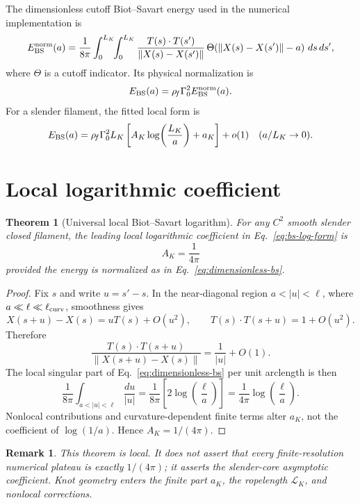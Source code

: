 \documentclass[11pt]{article}
\newcommand{\rhof}{\rho_{\!f}}
\newcommand{\LK}{\mathcal L_K}
\newtheorem{theorem}{Theorem}
\newtheorem{remark}{Remark}
\begin{document}
The dimensionless cutoff Biot--Savart energy used in the numerical implementation is
\begin{equation}
  E_{\rm BS}^{\rm norm}(a)
  =
  \frac{1}{8\pi}
  \int_{0}^{L_K}\!\!\int_{0}^{L_K}
  \frac{T(s)\cdot T(s')}{\lVert X(s)-X(s')\rVert}
  \,\Theta\!\left(\lVert X(s)-X(s')\rVert-a\right)\,ds\,ds',
  \label{eq:dimensionless-bs}
\end{equation}
where \(\Theta\) is a cutoff indicator.  Its physical normalization is
\begin{equation}
  E_{\rm BS}(a)
  =
  \rhof\Gamma_0^2
  E_{\rm BS}^{\rm norm}(a).
\end{equation}
For a slender filament, the fitted local form is
\begin{equation}
  E_{\rm BS}(a)
  =
  \rhof\Gamma_0^2 L_K
  \left[
  A_K\log\!\left(\frac{L_K}{a}\right)+a_K
  \right]
  +
  o(1)
  \quad(a/L_K\to0).
  \label{eq:bs-log-form}
\end{equation}

\section{Local logarithmic coefficient}
\label{sec:AK}

\begin{theorem}[Universal local Biot--Savart logarithm]
For any \(C^2\) smooth slender closed filament, the leading local logarithmic coefficient in
Eq.~\eqref{eq:bs-log-form} is
\[
  A_K=\frac{1}{4\pi}
\]
provided the energy is normalized as in Eq.~\eqref{eq:dimensionless-bs}.
\end{theorem}

\begin{proof}
Fix \(s\) and write \(u=s'-s\).  In the near-diagonal region
\(a<|u|<\ell\), where \(a\ll \ell\ll\ell_{\rm curv}\), smoothness gives
\[
  X(s+u)-X(s)=uT(s)+O(u^2),
  \qquad
  T(s)\cdot T(s+u)=1+O(u^2).
\]
Therefore
\[
  \frac{T(s)\cdot T(s+u)}{\lVert X(s+u)-X(s)\rVert}
  =
  \frac{1}{|u|}+O(1).
\]
The local singular part of Eq.~\eqref{eq:dimensionless-bs} per unit arclength is then
\[
  \frac{1}{8\pi}
  \int_{a<|u|<\ell}\frac{du}{|u|}
  =
  \frac{1}{8\pi}
  \left[
  2\log\!\left(\frac{\ell}{a}\right)
  \right]
  =
  \frac{1}{4\pi}\log\!\left(\frac{\ell}{a}\right).
\]
Nonlocal contributions and curvature-dependent finite terms alter \(a_K\), not the coefficient
of \(\log(1/a)\).  Hence \(A_K=1/(4\pi)\).
\end{proof}

\begin{remark}
This theorem is local.  It does not assert that every finite-resolution numerical plateau is
exactly \(1/(4\pi)\); it asserts the slender-core asymptotic coefficient.  Knot geometry enters
the finite part \(a_K\), the ropelength \(\LK\), and nonlocal corrections.
\end{remark}
\end{document}

